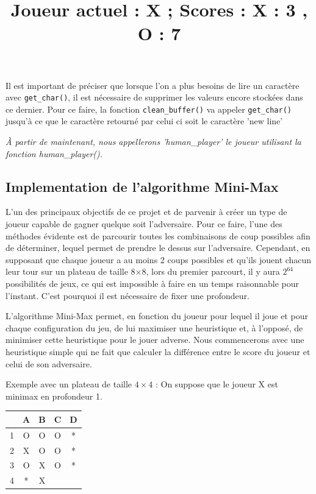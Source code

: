 \documentclass{report}
\begin{document}
Il est important de préciser que lorsque l'on a plus besoins de lire un caractère avec \texttt{get\_char()}, il est nécessaire de supprimer les valeurs encore stockées dans ce dernier. Pour ce faire, la fonction \texttt{clean\_buffer()} va appeler \texttt{get\_char()} jusqu'à ce que le caractère retourné par celui ci soit le caractère 'new line'\newline

\textit{À partir de maintenant, nous appellerons 'human\_player' le joueur utilisant la fonction human\_player().}


\subsection{Implementation de l'algorithme Mini-Max}
L'un des principaux objectifs de ce projet et de parvenir à créer un type de joueur capable de gagner quelque soit l'adversaire. Pour ce faire, l'une des méthodes évidente est de parcourir toutes les combinaisons de coup possibles afin de déterminer, lequel permet de prendre le dessus sur l'adversaire. Cependant, en supposant que chaque joueur a au moins 2 coups possibles et qu'ils jouent chacun leur tour sur un plateau de taille 8$\times$8, lors du premier parcourt, il y aura $2^{64}$ possibilités de jeux, ce qui est impossible à faire en un temps raisonnable pour l'instant. C'est pourquoi il est nécessaire de fixer une profondeur.

L'algorithme Mini-Max permet, en fonction du joueur pour lequel il joue et pour chaque configuration du jeu, de lui maximiser une heuristique et, à l'opposé, de minimiser cette heuristique pour le jouer adverse.
Nous commencerons avec une heuristique simple qui ne fait que calculer la différence entre le score du joueur et celui de son adversaire.
\newline

Exemple avec un plateau de taille $4\times4$ :
On suppose que le joueur X est minimax en profondeur 1.


\begin{center}
\renewcommand{\arraystretch} {1.5}
    \begin{tabular}{c|c|c|c|c|}
          &A & B & C & D \\
        \hline
        1 & O & O & O & *\\
        \hline
        2 & X & O & O & * \\
        \hline
        3 & O & X & O & * \\
        \hline
        4 & * & X &  &  \\
        \hline
    \end{tabular}

\end{center}
\begin{center}
    \label{Figure 1}
    \title{Joueur actuel : X ; Scores : X : 3 , O : 7}
\end{center}
\end{document}
